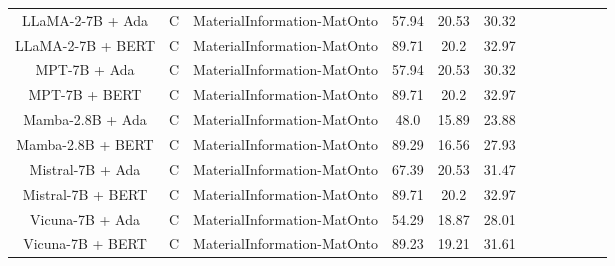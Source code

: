 \begin{table}
\begin{tabular}{|c|c|c|c|c|c|c|c|c|c|c|c|}
	LLaMA-2-7B + Ada  & C & MaterialInformation-MatOnto  &  57.94 &  20.53 & 30.32  \\
	LLaMA-2-7B + BERT  & C & MaterialInformation-MatOnto  &  89.71 &  20.2 & 32.97  \\
	MPT-7B + Ada  & C & MaterialInformation-MatOnto  &  57.94 &  20.53 & 30.32  \\
	MPT-7B + BERT  & C & MaterialInformation-MatOnto  &  89.71 &  20.2 & 32.97  \\
	Mamba-2.8B + Ada  & C & MaterialInformation-MatOnto  &  48.0 &  15.89 & 23.88  \\
	Mamba-2.8B + BERT  & C & MaterialInformation-MatOnto  &  89.29 &  16.56 & 27.93  \\
	Mistral-7B + Ada  & C & MaterialInformation-MatOnto  &  67.39 &  20.53 & 31.47  \\
	Mistral-7B + BERT  & C & MaterialInformation-MatOnto  &  89.71 &  20.2 & 32.97  \\
	Vicuna-7B + Ada  & C & MaterialInformation-MatOnto  &  54.29 &  18.87 & 28.01  \\
	Vicuna-7B + BERT  & C & MaterialInformation-MatOnto  &  89.23 &  19.21 & 31.61  \\
	\hline
\end{tabular}
    \end{table}








